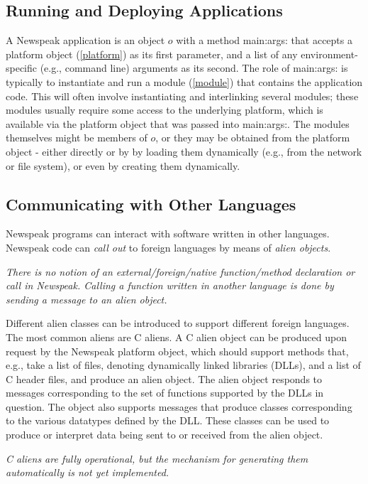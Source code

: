 \documentclass{article}
\newcommand{\code}[1]{{\sf #1}}
\begin{document}
\subsection{Running and Deploying Applications}
\label{deploy}

A Newspeak application is an object $o$ with a method \code{main:args:} that accepts a platform object (\ref{platform})  as its first parameter, and a list of any environment-specific (e.g., command line) arguments as its second.  The role of \code{main:args:} is typically to instantiate and run a module  (\ref{module}) that contains the application code. This will often involve instantiating and interlinking several modules; these modules usually require some access to the underlying platform, which is available via the platform object that was passed into \code{main:args:}. The modules themselves might be members of $o$, or they may be obtained from the platform object - either directly or by by loading them dynamically  (e.g., from the network or file system), or even by creating them dynamically.


\subsection{Communicating with Other Languages}
\label{aliens}

Newspeak programs can interact with software written in other languages. Newspeak code can {\em call out} to foreign languages by means of {\em alien objects}. 

{\it
There is no notion of an external/foreign/native function/method declaration or call in Newspeak.
Calling a function written in another language is done by sending a message to an alien object.
}

Different alien classes can be introduced to support different foreign languages. The most common aliens are C aliens. A C alien object can be produced upon request by the Newspeak platform object, which should
support methods that, e.g., take a list of files, denoting dynamically linked libraries (DLLs), and a list of C header files, and produce an alien object. The alien object  responds to messages corresponding to the set of functions supported by the DLLs in question.  The object also supports messages
that produce classes corresponding to the various datatypes defined by the DLL.  These classes can be used to produce or interpret data being sent to or received from the alien object.

{\it C aliens are fully operational, but the mechanism for generating them automatically is not yet implemented.}
\end{document}
